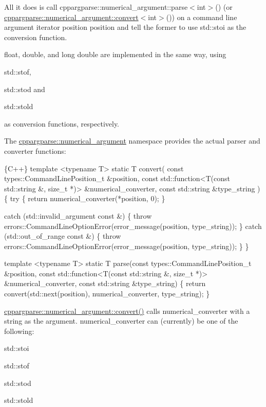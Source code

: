 All it does is call {\ttfamily cppargparse\+::numerical\+\_\+argument\+::parse$<$int$>$()} (or {\ttfamily \hyperlink{structcppargparse_1_1numerical__argument_ab775dbbfc851bbd9052b70dfdf0dbb77}{cppargparse\+::numerical\+\_\+argument\+::convert}$<$int$>$()}) on a command line argument iterator position {\ttfamily position} and tell the former to use {\ttfamily std\+::stoi} as the conversion function.

{\ttfamily float}, {\ttfamily double}, and {\ttfamily long double} are implemented in the same way, using
\begin{DoxyItemize}
\item {\ttfamily std\+::stof},
\item {\ttfamily std\+::stod} and
\item {\ttfamily std\+::stold}
\end{DoxyItemize}

as conversion functions, respectively.

The {\ttfamily \hyperlink{structcppargparse_1_1numerical__argument}{cppargparse\+::numerical\+\_\+argument}} namespace provides the actual parser and converter functions\+: 
\begin{DoxyCode}
\{C++\}
template <typename T>
static T convert(
        const types::CommandLinePosition\_t &position,
        const std::function<T(const std::string &, size\_t *)> &numerical\_converter,
        const std::string &type\_string
    )
\{
    try
    \{
        return numerical\_converter(*position, 0);
    \}

    catch (std::invalid\_argument const &)
    \{
        throw errors::CommandLineOptionError(error\_message(position, type\_string));
    \}
    catch (std::out\_of\_range const &)
    \{
        throw errors::CommandLineOptionError(error\_message(position, type\_string));
    \}
\}

template <typename T>
static T parse(const types::CommandLinePosition\_t &position,
        const std::function<T(const std::string &, size\_t *)> &numerical\_converter,
        const std::string &type\_string)
\{
    return convert(std::next(position), numerical\_converter, type\_string);
\}
\end{DoxyCode}


{\ttfamily \hyperlink{structcppargparse_1_1numerical__argument_ab775dbbfc851bbd9052b70dfdf0dbb77}{cppargparse\+::numerical\+\_\+argument\+::convert()}} calls {\ttfamily numerical\+\_\+converter} with a string as the argument. {\ttfamily numerical\+\_\+converter} can (currently) be one of the following\+:
\begin{DoxyItemize}
\item {\ttfamily std\+::stoi}
\item {\ttfamily std\+::stof}
\item {\ttfamily std\+::stod}
\item {\ttfamily std\+::stold}
\end{DoxyItemize}

